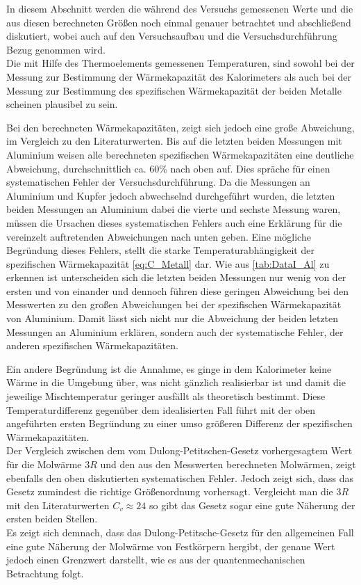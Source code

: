 In diesem Abschnitt werden die während des Versuchs gemessenen Werte und
die aus diesen berechneten Größen noch einmal genauer betrachtet und 
abschließend diskutiert, wobei auch auf den Versuchsaufbau und die
Versuchsdurchführung Bezug genommen wird.\\


Die mit Hilfe des Thermoelements gemessenen Temperaturen, sind sowohl bei der 
Messung zur Bestimmung der Wärmekapazität des Kalorimeters als auch bei der Messung
zur Bestimmung des spezifischen Wärmekapazität der beiden Metalle scheinen plausibel zu sein.

Bei den berechneten Wärmekapazitäten, zeigt sich jedoch eine große Abweichung, im Vergleich zu den Literaturwerten. Bis auf die letzten beiden Messungen mit Aluminium weisen alle 
berechneten spezifischen Wärmekapazitäten eine deutliche Abweichung, durchschnittlich
ca. 60\% nach oben auf. Dies spräche für einen systematischen Fehler der Versuchsdurchführung.
Da die Messungen an Aluminium und Kupfer jedoch abwechselnd durchgeführt wurden, die letzten beiden Messungen an Aluminium dabei die vierte und sechste Messung waren, müssen die Ursachen dieses systematischen Fehlers auch eine Erklärung für die vereinzelt auftretenden Abweichungen nach unten geben.
Eine mögliche Begründung dieses Fehlers, stellt die starke Temperaturabhängigkeit der 
spezifischen Wärmekapazität \eqref{eq:C_Metall} dar. Wie aus \autoref{tab:DataI_Al} zu erkennen ist unterscheiden sich die letzten beiden Messungen nur wenig von der ersten und von einander und dennoch führen diese geringen Abweichung  bei 
den Messwerten zu den großen Abweichungen bei der spezifischen
Wärmekapazität von Aluminium. Damit lässt sich nicht nur die 
Abweichung der beiden letzten Messungen an Aluminium erklären, sondern
auch der systematische Fehler, der anderen spezifischen
Wärmekapazitäten.

Ein andere Begründung ist die Annahme, es ginge in 
dem Kalorimeter keine Wärme in die Umgebung über, was nicht  
gänzlich realisierbar ist und damit die jeweilige Mischtemperatur 
geringer ausfällt als theoretisch bestimmt.
Diese Temperaturdifferenz gegenüber dem idealisierten Fall führt 
mit der oben angeführten ersten Begründung zu einer umso größeren 
Differenz der spezifischen Wärmekapazitäten.\\
Der Vergleich zwischen dem vom Dulong-Petitschen-Gesetz
vorhergesagtem Wert für die Molwärme $3R$ und den aus den 
Messwerten berechneten Molwärmen, zeigt ebenfalls den oben 
diskutierten systematischen Fehler. 
Jedoch zeigt sich, dass das Gesetz zumindest die richtige 
Größenordnung vorhersagt. Vergleicht man die $3R$ mit den
Literaturwerten $C_{v} \approx 24$ so gibt das Gesetz sogar eine gute 
Näherung der ersten beiden Stellen.\\            

Es zeigt sich demnach, dass das Dulong-Petitsche-Gesetz für den allgemeinen 
Fall eine gute Näherung der Molwärme von Festkörpern hergibt, der genaue Wert 
jedoch einen Grenzwert darstellt, wie es aus der quantenmechanischen Betrachtung folgt.    
 
